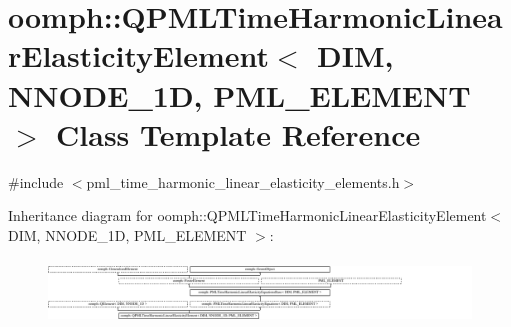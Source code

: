 \hypertarget{classoomph_1_1QPMLTimeHarmonicLinearElasticityElement}{}\section{oomph\+:\+:Q\+P\+M\+L\+Time\+Harmonic\+Linear\+Elasticity\+Element$<$ D\+IM, N\+N\+O\+D\+E\+\_\+1D, P\+M\+L\+\_\+\+E\+L\+E\+M\+E\+NT $>$ Class Template Reference}
\label{classoomph_1_1QPMLTimeHarmonicLinearElasticityElement}


{\ttfamily \#include $<$pml\+\_\+time\+\_\+harmonic\+\_\+linear\+\_\+elasticity\+\_\+elements.\+h$>$}

Inheritance diagram for oomph\+:\+:Q\+P\+M\+L\+Time\+Harmonic\+Linear\+Elasticity\+Element$<$ D\+IM, N\+N\+O\+D\+E\+\_\+1D, P\+M\+L\+\_\+\+E\+L\+E\+M\+E\+NT $>$\+:\begin{figure}[H]
\begin{center}
\leavevmode
\includegraphics[height=1.751094cm]{classoomph_1_1QPMLTimeHarmonicLinearElasticityElement}
\end{center}
\end{figure}
